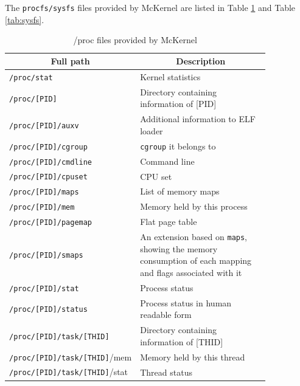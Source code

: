 \documentclass[twoside,11pt,fleqn]{book}
\begin{document}
\section{}\label{sec:procfs}
The \texttt{procfs/sysfs} files provided by McKernel are listed in Table \ref{tab:procfs} and Table \ref{tab:sysfs}.
%
\begin{table}[!htb]
\centering
\small
\caption{/proc files provided by McKernel}\vspace{0.0em}
\label{tab:procfs}
\begin{tabular}{|p{0.35\linewidth}|p{0.50\linewidth}|} \hline
\multicolumn{1}{|c}{\textbf{Full path}}&\multicolumn{1}{|c|}{\textbf{Description}}\\ \hline \hline
\texttt{/proc/stat}&Kernel statistics\\ \hline
\texttt{/proc/[PID]}& Directory containing information of [PID] \\ \hline
\texttt{/proc/[PID]/auxv}&Additional information to ELF loader\\ \hline
\texttt{/proc/[PID]/cgroup}&\texttt{cgroup} it belongs to\\ \hline
\texttt{/proc/[PID]/cmdline}&Command line\\ \hline
\texttt{/proc/[PID]/cpuset}&CPU set\\ \hline
\texttt{/proc/[PID]/maps}&List of memory maps\\ \hline
\texttt{/proc/[PID]/mem}&Memory held by this process\\ \hline
\texttt{/proc/[PID]/pagemap}&Flat page table\\ \hline
\texttt{/proc/[PID]/smaps}&An extension based on \texttt{maps}, showing the memory consumption of each mapping and flags associated with it\\ \hline
\texttt{/proc/[PID]/stat}&Process status\\ \hline
\texttt{/proc/[PID]/status}&Process status in human readable form\\ \hline
\texttt{/proc/[PID]/task/[THID]}&Directory containing information of [THID] \\ \hline
\texttt{/proc/[PID]/task/[THID]}/mem&Memory held by this thread\\ \hline
\texttt{/proc/[PID]/task/[THID]}/stat&Thread status\\ \hline


\end{tabular}
\end{table}
\end{document}
